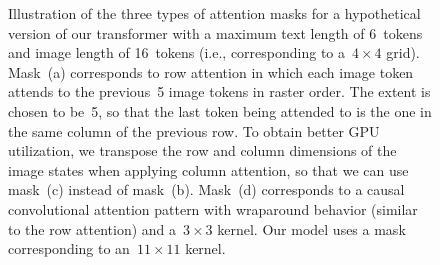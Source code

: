 \documentclass{article}
\begin{document}
\begin{figure}[t]
    \centering
    \hspace{2mm}%
    \hspace{2mm}%
    \hspace{2mm}%
    \caption{Illustration of the three types of attention masks for a hypothetical version of our transformer with a maximum text length of 6~tokens and image length of 16~tokens (i.e., corresponding to a~$4 \times 4$ grid). Mask~(a) corresponds to row attention in which each image token attends to the previous~5 image tokens in raster order. The extent is chosen to be~5, so that the last token being attended to is the one in the same column of the previous row. To obtain better GPU utilization, we transpose the row and column dimensions of the image states when applying column attention, so that we can use mask~(c) instead of mask~(b). Mask~(d) corresponds to a causal convolutional attention pattern with wraparound behavior (similar to the row attention) and a~$3 \times 3$ kernel. Our model uses a mask corresponding to an~$11 \times 11$ kernel.}
    \label{fig:xf_attn}
\end{figure}
\end{document}
